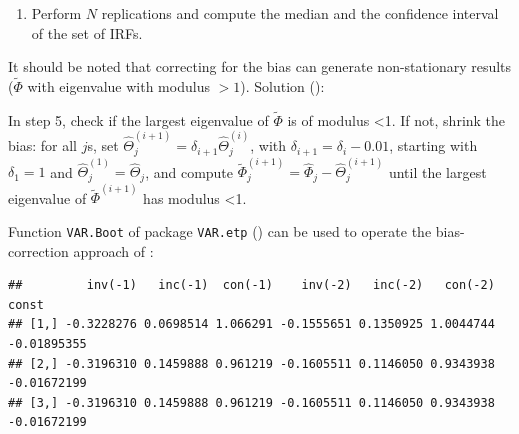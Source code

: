 \documentclass[
  12pt,
]{book}
\newenvironment{Shaded}{\begin{snugshade}}{\end{snugshade}}
\newcommand{\AttributeTok}[1]{\textcolor[rgb]{0.77,0.63,0.00}{#1}}
\newcommand{\CommentTok}[1]{\textcolor[rgb]{0.56,0.35,0.01}{\textit{#1}}}
\newcommand{\DecValTok}[1]{\textcolor[rgb]{0.00,0.00,0.81}{#1}}
\newcommand{\FunctionTok}[1]{\textcolor[rgb]{0.00,0.00,0.00}{#1}}
\newcommand{\NormalTok}[1]{#1}
\newcommand{\OtherTok}[1]{\textcolor[rgb]{0.56,0.35,0.01}{#1}}
\newcommand{\SpecialCharTok}[1]{\textcolor[rgb]{0.00,0.00,0.00}{#1}}
\newcommand{\StringTok}[1]{\textcolor[rgb]{0.31,0.60,0.02}{#1}}
\providecommand{\tightlist}{%
  \setlength{\itemsep}{0pt}\setlength{\parskip}{0pt}}
\theoremstyle{definition}
\theoremstyle{definition}
\theoremstyle{definition}
\theoremstyle{definition}
\theoremstyle{remark}
\begin{document}
\begin{enumerate}
\def\labelenumi{\arabic{enumi}.}
\setcounter{enumi}{6}
\tightlist
\item
  Perform \(N\) replications and compute the median and the confidence interval of the set of IRFs.
\end{enumerate}

It should be noted that correcting for the bias can generate non-stationary results (\(\tilde \Phi\) with eigenvalue with modulus \(>1\)). Solution (\citet{Kilian_1998}):

In step 5, check if the largest eigenvalue of \(\tilde\Phi\) is of modulus \textless1.
If not, shrink the bias: for all \(j\)s, set \(\widehat{\Theta}_j^{(i+1)}=\delta_{i+1}\widehat{\Theta}_j^{(i)}\), with \(\delta_{i+1}=\delta_i-0.01\), starting with \(\delta_1=1\) and \(\widehat{\Theta}_j^{(1)} =\widehat{\Theta}_j\), and compute \(\widetilde{\Phi}_j^{(i+1)}=\widehat{\Phi}_j-\widehat{\Theta}_j^{(i+1)}\) until the largest eigenvalue of \(\tilde\Phi^{(i+1)}\) has modulus \textless1.

Function \texttt{VAR.Boot} of package \texttt{VAR.etp} (\citet{VARetp}) can be used to operate the bias-correction approach of \citet{Kilian_1998}:

\begin{Shaded}
\end{Shaded}

\begin{verbatim}
##         inv(-1)   inc(-1)  con(-1)    inv(-2)   inc(-2)   con(-2)       const
## [1,] -0.3228276 0.0698514 1.066291 -0.1555651 0.1350925 1.0044744 -0.01895355
## [2,] -0.3196310 0.1459888 0.961219 -0.1605511 0.1146050 0.9343938 -0.01672199
## [3,] -0.3196310 0.1459888 0.961219 -0.1605511 0.1146050 0.9343938 -0.01672199
\end{verbatim}
\end{document}
